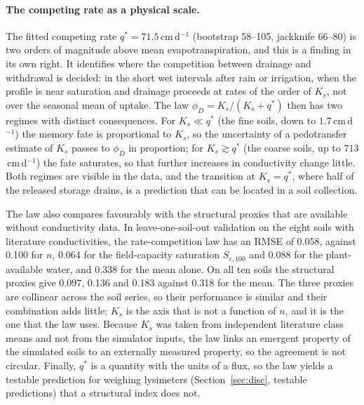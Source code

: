 \documentclass[preprint,12pt,authoryear]{elsarticle}
\begin{document}
\paragraph{The competing rate as a physical scale.}
The fitted competing rate $q^\ast=71.5$\,cm\,d$^{-1}$ (bootstrap 58--105, jackknife 66--80) is two orders of magnitude above mean evapotranspiration, and this is a finding in its own right. It identifies where the competition between drainage and withdrawal is decided: in the short wet intervals after rain or irrigation, when the profile is near saturation and drainage proceeds at rates of the order of $K_s$, not over the seasonal mean of uptake. The law $\phi_D=K_s/(K_s+q^\ast)$ then has two regimes with distinct consequences. For $K_s\ll q^\ast$ (the fine soils, down to $1.7$\,cm\,d$^{-1}$) the memory fate is proportional to $K_s$, so the uncertainty of a pedotransfer estimate of $K_s$ passes to $\phi_D$ in proportion; for $K_s\gtrsim q^\ast$ (the coarse soils, up to $713$\,cm\,d$^{-1}$) the fate saturates, so that further increases in conductivity change little. Both regimes are visible in the data, and the transition at $K_s=q^\ast$, where half of the released storage drains, is a prediction that can be located in a soil collection.

The law also compares favourably with the structural proxies that are available without conductivity data. In leave-one-soil-out validation on the eight soils with literature conductivities, the rate-competition law has an RMSE of 0.058, against 0.100 for $n$, 0.064 for the field-capacity saturation $S_{e,100}$ and 0.088 for the plant-available water, and 0.338 for the mean alone. On all ten soils the structural proxies give 0.097, 0.136 and 0.183 against 0.318 for the mean. The three proxies are collinear across the soil series, so their performance is similar and their combination adds little; $K_s$ is the axis that is not a function of $n$, and it is the one that the law uses. Because $K_s$ was taken from independent literature class means \citep{Carsel1988} and not from the simulator inputs, the law links an emergent property of the simulated soils to an externally measured property, so the agreement is not circular. Finally, $q^\ast$ is a quantity with the units of a flux, so the law yields a testable prediction for weighing lysimeters (Section~\ref{sec:disc}, testable predictions) that a structural index does not.
\end{document}
